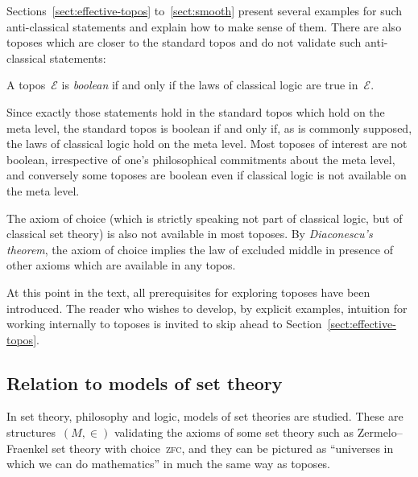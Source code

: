 \documentclass[graybox]{svmult}
\renewcommand{\E}{\mathcal{E}}
\renewcommand{\_}{\mathpunct{.}\,}
\newcommand{\?}{\,{:}\,}
\begin{document}
Sections~\ref{sect:effective-topos} to~\ref{sect:smooth} present several
examples for such anti-classical statements and explain how to make sense of
them. There are also toposes which are closer to the standard topos and do not validate such
anti-classical statements:

\begin{definition}A topos~$\E$ is \emph{boolean} if and only if the laws of classical
logic are true in~$\E$.\end{definition}

Since exactly those statements hold in the standard topos which hold on the
meta level, the standard topos is boolean if and only if, as is commonly supposed, the laws
of classical logic hold on the meta level. Most toposes of interest are not
boolean, irrespective of one's philosophical commitments about the meta level,
and conversely some toposes are boolean even if classical logic is not
available on the meta level.

\begin{remark}The axiom of choice (which is strictly speaking not part of
classical logic, but of classical set theory) is also not available in most
toposes. By \emph{Diaconescu's theorem}, the axiom of choice implies the law of
excluded middle in presence of other axioms which are available in any topos.
\end{remark}



At this point in the text, all prerequisites for exploring toposes have been
introduced. The reader who wishes to develop, by explicit examples, intuition
for working internally to toposes is invited to skip ahead to
Section~\ref{sect:effective-topos}.


\subsection{Relation to models of set theory} In set theory, philosophy and
logic, models of set theories are studied. These are structures~$(M,\in)$
validating the axioms of some set theory such as Zermelo--Fraenkel set theory
with choice~\textsc{zfc}, and they can be pictured as ``universes in which we
can do mathematics'' in much the same way as toposes.
\end{document}
